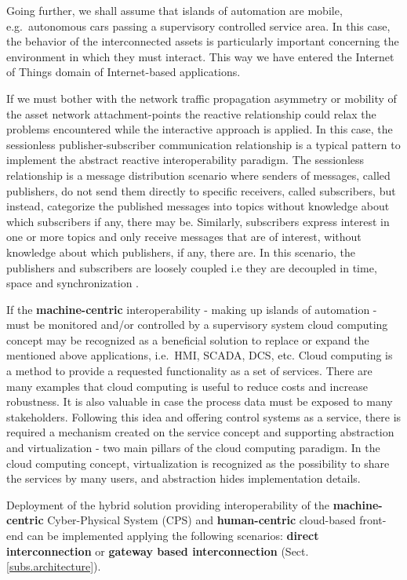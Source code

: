 \documentclass{jacsart}
\begin{document}
Going further, we shall assume that islands of automation are mobile, e.g.~autonomous cars passing a supervisory controlled service area. In this case, the behavior of the interconnected assets is particularly important concerning the environment in which they must interact. This way we have entered the Internet of Things domain of Internet-based applications.

If we must bother with the network traffic propagation asymmetry or mobility of the asset network attachment-points the reactive relationship could relax the problems encountered while the interactive approach is applied. In this case, the sessionless publisher-subscriber communication relationship is a typical pattern to implement the abstract reactive interoperability paradigm. The sessionless relationship is a message distribution scenario where senders of messages, called publishers, do not send them directly to specific receivers, called subscribers, but instead, categorize the published messages into topics without knowledge about which subscribers if any, there may be. Similarly, subscribers express interest in one or more topics and only receive messages that are of interest, without knowledge about which publishers, if any, there are. In this scenario, the publishers and subscribers are loosely coupled i.e they are decoupled in time, space and synchronization \cite{RefWorks:doc:5c44e246e4b0591b15ea9e59}.

If the \textbf{machine-centric} interoperability - making up islands of automation - must be monitored and/or controlled by a supervisory system cloud computing concept may be recognized as a beneficial solution to replace or expand the mentioned above applications, i.e.~HMI, SCADA, DCS, etc. Cloud computing is a method to provide a requested functionality as a set of services. There are many examples that cloud computing is useful to reduce costs and increase robustness. It is also valuable in case the process data must be exposed to many stakeholders. Following this idea and offering control systems as a service, there is required a mechanism created on the service concept and supporting abstraction and virtualization - two main pillars of the cloud computing paradigm. In the cloud computing concept, virtualization is recognized as the possibility to share the services by many users, and abstraction hides implementation details.

Deployment of the hybrid solution providing interoperability of the \textbf{machine-centric} Cyber-Physical System (CPS) and \textbf{human-centric} cloud-based front-end can be implemented applying the following scenarios: \textbf{direct interconnection} or \textbf{gateway based interconnection} (Sect. \ref*{subs.architecture}).
\end{document}
